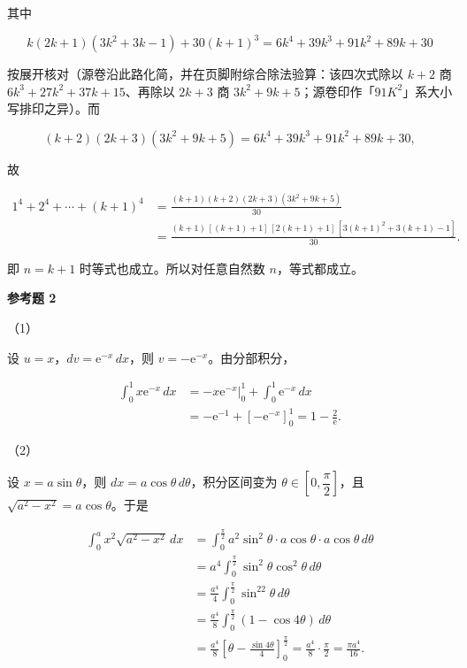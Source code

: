 \begin{answer}
其中

\nopagebreak[4]
\[
k(2k+1)(3k^2+3k-1)+30(k+1)^3=6k^4+39k^3+91k^2+89k+30
\]

按展开核对（源卷沿此路化简，并在页脚附综合除法验算：该四次式除以 $k+2$ 商 $6k^3+27k^2+37k+15$、再除以 $2k+3$ 商 $3k^2+9k+5$；源卷印作「$91K^2$」系大小写排印之异）。而

\nopagebreak[4]
\[
(k+2)(2k+3)(3k^2+9k+5)=6k^4+39k^3+91k^2+89k+30,
\]

故

\nopagebreak[4]
\[
\begin{aligned}
1^4+2^4+\cdots+(k+1)^4
&=\frac{(k+1)(k+2)(2k+3)(3k^2+9k+5)}{30}\\
&=\frac{(k+1)\,[(k+1)+1]\,[2(k+1)+1]\,[3(k+1)^2+3(k+1)-1]}{30}.
\end{aligned}
\]

即 $n=k+1$ 时等式也成立。所以对任意自然数 $n$，等式都成立。

\textbf{参考题 2}

（1）

设 $u=x$，$dv=\mathrm e^{-x}\,dx$，则 $v=-\mathrm e^{-x}$。由分部积分，

\nopagebreak[4]
\[
\begin{aligned}
\int_0^1 x\mathrm e^{-x}\,dx
&=-x\mathrm e^{-x}\Big|_0^1+\int_0^1\mathrm e^{-x}\,dx\\
&=-\mathrm e^{-1}+\left[-\mathrm e^{-x}\right]_0^1
=1-\frac2{\mathrm e}.
\end{aligned}
\]

（2）

设 $x=a\sin\theta$，则 $dx=a\cos\theta\,d\theta$，积分区间变为 $\theta\in\left[0,\dfrac\pi2\right]$，且 $\sqrt{a^2-x^2}=a\cos\theta$。于是

\nopagebreak[4]
\[
\begin{aligned}
\int_0^a x^2\sqrt{a^2-x^2}\,dx
&=\int_0^{\frac\pi2}a^2\sin^2\theta\cdot a\cos\theta\cdot a\cos\theta\,d\theta\\
&=a^4\int_0^{\frac\pi2}\sin^2\theta\cos^2\theta\,d\theta\\
&=\frac{a^4}{4}\int_0^{\frac\pi2}\sin^22\theta\,d\theta\\
&=\frac{a^4}{8}\int_0^{\frac\pi2}(1-\cos4\theta)\,d\theta\\
&=\frac{a^4}{8}\left[\theta-\frac{\sin4\theta}{4}\right]_0^{\frac\pi2}
=\frac{a^4}{8}\cdot\frac\pi2
=\frac{\pi a^4}{16}.
\end{aligned}
\]


\end{answer}
